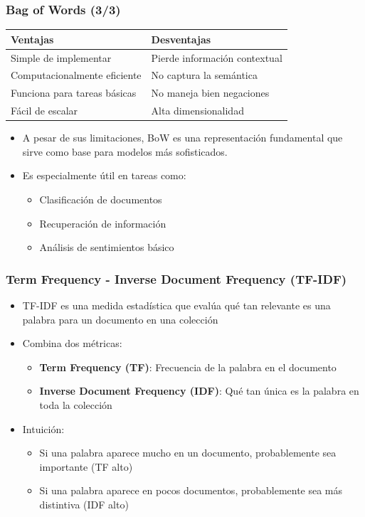 \documentclass[handout]{beamer}
\begin{document}
\begin{frame}\frametitle{Bag of Words (3/3)}
  \hfill
  \begin{table}[h]
    \centering
    \small 
    \begin{tabular}{|p{5cm}|p{5cm}|}
    \hline
    \textbf{Ventajas} & \textbf{Desventajas} \\
    \hline
    Simple de implementar & Pierde información contextual \\
    Computacionalmente eficiente & No captura la semántica \\
    Funciona para tareas básicas & No maneja bien negaciones \\
    Fácil de escalar & Alta dimensionalidad \\
    \hline
    \end{tabular}
    \end{table}
    \hfill

\begin{itemize}
\item A pesar de sus limitaciones, BoW es una representación fundamental que sirve como base para modelos más sofisticados.
\item Es especialmente útil en tareas como:
  \begin{itemize}
  \item Clasificación de documentos
  \item Recuperación de información
  \item Análisis de sentimientos básico
  \end{itemize}
\end{itemize}
\end{frame}

\begin{frame}\frametitle{Term Frequency - Inverse Document Frequency (TF-IDF)}
\begin{itemize}
    \item TF-IDF es una medida estadística que evalúa qué tan relevante es una palabra para un documento en una colección
    \item Combina dos métricas:
    \begin{itemize}
        \item \textbf{Term Frequency (TF)}: Frecuencia de la palabra en el documento
        \item \textbf{Inverse Document Frequency (IDF)}: Qué tan única es la palabra en toda la colección
    \end{itemize}
    \item Intuición:
    \begin{itemize}
        \item Si una palabra aparece mucho en un documento, probablemente sea importante (TF alto)
        \item Si una palabra aparece en pocos documentos, probablemente sea más distintiva (IDF alto)
    \end{itemize}
\end{itemize}
\end{frame}
\end{document}
